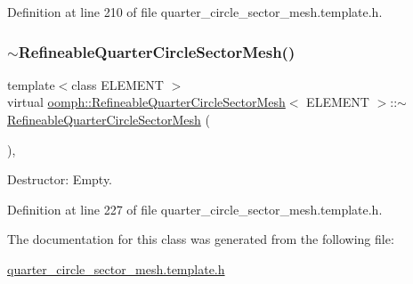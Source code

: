 Definition at line 210 of file quarter\+\_\+circle\+\_\+sector\+\_\+mesh.\+template.\+h.

\mbox{\label{classoomph_1_1RefineableQuarterCircleSectorMesh_abf958060ab5ea27a2ca079cba58af8f5}} 
\subsubsection{\texorpdfstring{$\sim$\+Refineable\+Quarter\+Circle\+Sector\+Mesh()}{~RefineableQuarterCircleSectorMesh()}}
{\footnotesize\ttfamily template$<$class E\+L\+E\+M\+E\+NT $>$ \\
virtual \hyperlink{classoomph_1_1RefineableQuarterCircleSectorMesh}{oomph\+::\+Refineable\+Quarter\+Circle\+Sector\+Mesh}$<$ E\+L\+E\+M\+E\+NT $>$\+::$\sim$\hyperlink{classoomph_1_1RefineableQuarterCircleSectorMesh}{Refineable\+Quarter\+Circle\+Sector\+Mesh} (\begin{DoxyParamCaption}{ }\end{DoxyParamCaption})\hspace{0.3cm}{\ttfamily [inline]}, {\ttfamily [virtual]}}



Destructor\+: Empty. 



Definition at line 227 of file quarter\+\_\+circle\+\_\+sector\+\_\+mesh.\+template.\+h.



The documentation for this class was generated from the following file\+:\begin{DoxyCompactItemize}
\item 
\hyperlink{quarter__circle__sector__mesh_8template_8h}{quarter\+\_\+circle\+\_\+sector\+\_\+mesh.\+template.\+h}\end{DoxyCompactItemize}
